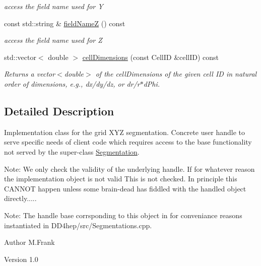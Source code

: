 \begin{DoxyCompactItemize}
\begin{DoxyCompactList}\small\item\em access the field name used for Y \item\end{DoxyCompactList}\item 
const std::string \& \hyperlink{class_d_d4hep_1_1_geometry_1_1_cartesian_grid_x_y_z_ae2ff56fa8c391e68491f54bd23de895a}{fieldNameZ} () const 
\begin{DoxyCompactList}\small\item\em access the field name used for Z \item\end{DoxyCompactList}\item 
std::vector$<$ double $>$ \hyperlink{class_d_d4hep_1_1_geometry_1_1_cartesian_grid_x_y_z_a97a650cec406e46aa9bdf2a8d745e9cb}{cellDimensions} (const CellID \&cellID) const 
\begin{DoxyCompactList}\small\item\em Returns a vector$<$double$>$ of the cellDimensions of the given cell ID in natural order of dimensions, e.g., dx/dy/dz, or dr/r$\ast$dPhi. \item\end{DoxyCompactList}\end{DoxyCompactItemize}


\subsection{Detailed Description}
Implementation class for the grid XYZ segmentation. Concrete user handle to serve specific needs of client code which requires access to the base functionality not served by the super-\/class \hyperlink{class_d_d4hep_1_1_geometry_1_1_segmentation}{Segmentation}.

Note: We only check the validity of the underlying handle. If for whatever reason the implementation object is not valid This is not checked. In principle this CANNOT happen unless some brain-\/dead has fiddled with the handled object directly.....

Note: The handle base corrsponding to this object in for conveniance reasons instantiated in DD4hep/src/Segmentations.cpp.

\begin{DoxyAuthor}{Author}
M.Frank 
\end{DoxyAuthor}
\begin{DoxyVersion}{Version}
1.0 
\end{DoxyVersion}


